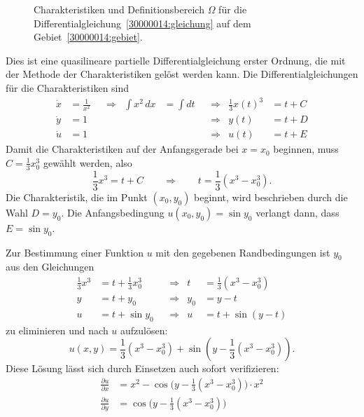 \begin{loesung}
\begin{figure}
\centering
{}
\caption{Charakteristiken und Definitionsbereich $\Omega$
für die Differentialgleichung~\eqref{30000014:gleichung}
auf dem Gebiet~\eqref{30000014:gebiet}.
\label{30000014:domain}
}
\end{figure}
Dies ist eine quasilineare partielle Differentialgleichung erster Ordnung, die
mit der Methode der Charakteristiken gelöst werden kann.
Die Differentialgleichungen für die Charakteristiken sind
\[
\begin{aligned}
\dot x &= \frac1{x^2} &&\Rightarrow& \int x^2\,dx &=\int dt &&\Rightarrow& \frac13 x(t)^3 &= t + C
\\
\dot y &= 1           &&           &              &         &&\Rightarrow& y(t) &= t + D
\\
\dot u &= 1           &&           &              &         &&\Rightarrow& u(t) &= t + E
\end{aligned}
\]
Damit die Charakteristiken auf der Anfangsgerade bei $x=x_0$ beginnen, muss
$C=\frac13x_0^3$ gewählt werden, also
\[
\frac13 x^3 = t + C
\qquad\Rightarrow\qquad
t = \frac13(x^3-x_0^3).
\]
Die Charakteristik, die im Punkt $(x_0,y_0)$ beginnt, wird beschrieben durch
die Wahl $D=y_0$.
Die Anfangsbedingung $u(x_0,y_0)=\sin y_0 $
verlangt dann, dass $E=\sin y_0 $.
\begin{teilaufgaben}
\item Zur Bestimmung einer Funktion $u$ mit den gegebenen Randbedingungen
ist $y_0$ aus den Gleichungen
\[
\begin{aligned}
{\textstyle\frac13}x^3 &= t + {\textstyle\frac13}x_0^3 &&\Rightarrow& t   &= \textstyle{\frac13}(x^3-x_0^3) \\
y           &= t + y_0          &&\Rightarrow& y_0 &= y - t              \\
u           &= t + \sin y_0     &&\Rightarrow& u   &= t + \sin(y-t)
\end{aligned}
\]
zu eliminieren und nach $u$ aufzulösen:
\[
u(x,y) = 
{\textstyle \frac13}(x^3-x_0^3)
+
\sin (y-{\textstyle \frac13}(x^3-x_0^3)).
\]
Diese Lösung lässt sich durch Einsetzen auch sofort verifizieren:
\begin{align*}
\frac{\partial u}{\partial x}
&=
x^2 -
\cos\bigl(y-{\textstyle\frac13}(x^3-x_0^3)\bigr)
\cdot x^2
\\
\frac{\partial u}{\partial y}
&=
\cos\bigl(y-{\textstyle\frac13}(x^3-x_0^3)\bigr)
\\

\end{align*}
\end{teilaufgaben}
\end{loesung}
